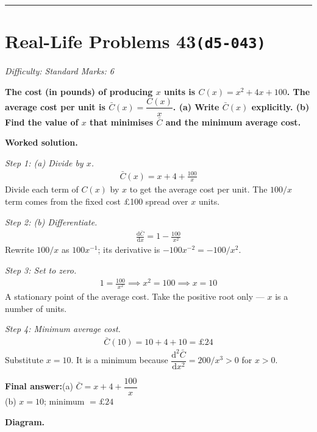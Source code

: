 \documentclass[11pt]{article}
\newcommand{\question}[1]{\par\medskip\noindent\textbf{#1}\par}
\begin{document}
\medskip\hrule

\section*{Real-Life Problems 43\quad\small\texttt{(d5-043)}}
\textit{Difficulty: Standard \quad\textbar\quad Marks: 6}

\question{The cost (in pounds) of producing \( x \) units is \( C(x) = x^2 + 4x + 100 \). The average cost per unit is \( \bar{C}(x) = \dfrac{C(x)}{x} \). (a) Write \( \bar{C}(x) \) explicitly. (b) Find the value of \( x \) that minimises \( \bar{C} \) and the minimum average cost.}

\textbf{Worked solution.}

\textit{Step 1: (a) Divide by \( x \).}
\[\begin{gathered}
\bar{C}(x) = x + 4 + \frac{100}{x}
\end{gathered}\]
Divide each term of \( C(x) \) by \( x \) to get the average cost per unit. The \( 100/x \) term comes from the fixed cost \pounds 100 spread over \( x \) units.

\textit{Step 2: (b) Differentiate.}
\[\begin{gathered}
\frac{\mathrm{d}\bar{C}}{\mathrm{d}x} = 1 - \frac{100}{x^2}
\end{gathered}\]
Rewrite \( 100/x \) as \( 100x^{-1} \); its derivative is \( -100x^{-2} = -100/x^2 \).

\textit{Step 3: Set to zero.}
\[\begin{gathered}
1 = \frac{100}{x^2} \implies x^2 = 100 \implies x = 10
\end{gathered}\]
A stationary point of the average cost. Take the positive root only --- \( x \) is a number of units.

\textit{Step 4: Minimum average cost.}
\[\begin{gathered}
\bar{C}(10) = 10 + 4 + 10 = \pounds 24
\end{gathered}\]
Substitute \( x = 10 \). It is a minimum because \( \dfrac{\mathrm{d}^2 \bar{C}}{\mathrm{d}x^2} = 200/x^3 > 0 \) for \( x > 0 \).

\begin{answerbox}
\textbf{Final answer:}\quad (a) \(\displaystyle  \bar{C} = x + 4 + \dfrac{100}{x} \) \\[3pt]  (b) \(\displaystyle  x = 10 \); minimum \(\displaystyle  = \pounds 24 \)
\end{answerbox}
\textbf{Diagram.}
\end{document}
